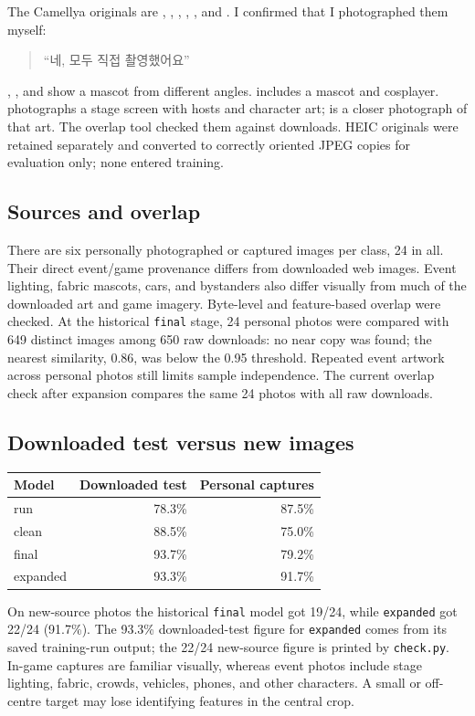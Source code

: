 \documentclass[11pt]{article}
\begin{document}
The Camellya originals are , , , , , and . I confirmed that I photographed them myself:
\begin{quote}
``네, 모두 직접 촬영했어요''
\end{quote}
, , and  show a mascot from different angles.  includes a mascot and cosplayer.  photographs a stage screen with hosts and character art;  is a closer photograph of that art. The overlap tool checked them against downloads. HEIC originals were retained separately and converted to correctly oriented JPEG copies for evaluation only; none entered training.


\endgroup
\subsection*{Sources and overlap}
There are six personally photographed or captured images per class, 24 in all. Their direct event/game provenance differs from downloaded web images. Event lighting, fabric mascots, cars, and bystanders also differ visually from much of the downloaded art and game imagery. Byte-level and feature-based overlap were checked. At the historical \texttt{final} stage, 24 personal photos were compared with 649 distinct images among 650 raw downloads: no near copy was found; the nearest similarity, 0.86, was below the 0.95 threshold. Repeated event artwork across personal photos still limits sample independence.
The current overlap check after expansion compares the same 24 photos with all raw downloads.

\subsection*{Downloaded test versus new images}
\begin{center}\begin{tabular}{lrr}
\toprule Model & Downloaded test & Personal captures \\
\midrule

run & 78.3\% & 87.5\% \\
clean & 88.5\% & 75.0\% \\
final & 93.7\% & 79.2\% \\
expanded & 93.3\% & 91.7\% \\
\bottomrule\end{tabular}\end{center}
On new-source photos the historical \texttt{final} model got 19/24, while \texttt{expanded} got 22/24 (91.7\%). The 93.3\% downloaded-test figure for \texttt{expanded} comes from its saved training-run output; the 22/24 new-source figure is printed by \texttt{check.py}. In-game captures are familiar visually, whereas event photos include stage lighting, fabric, crowds, vehicles, phones, and other characters. A small or off-centre target may lose identifying features in the central crop.
\end{document}
